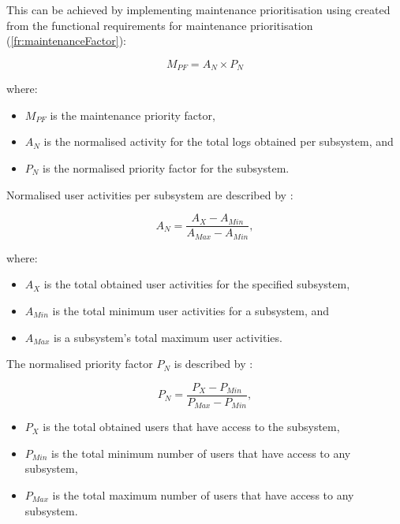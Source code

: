 This can be achieved by implementing maintenance prioritisation using  created from the functional requirements for maintenance prioritisation (\ref{fr:maintenanceFactor}):

\begin{equation}
	\label{eq:ch2_maintenanceFactorSimplified}
	M_{PF} = A_{N} \times P_{N}
\end{equation}

where:

\begin{itemize}
	\item $M_{PF}$ is the maintenance priority factor,
	\item $A_{N}$ is the normalised activity for the total logs obtained per subsystem, and
	\item $P_{N}$ is the normalised priority factor for the subsystem.
\end{itemize}

Normalised user activities per subsystem are described by :

\begin{equation}
	\label{eq:ch2_eventNormalised}
	A_{N} = \frac{A_X - A_{Min}}{A_{Max} - A_{Min}},
\end{equation}

where:

\begin{itemize}
	\item $A_X$ is the total obtained user activities for the specified subsystem,
	\item $A_{Min}$ is the total minimum user activities for a subsystem, and
	\item $A_{Max}$ is a subsystem's total maximum user activities.
\end{itemize}

The normalised priority factor $P_N$ is described by :

\begin{equation}
	\label{eq:ch2_priorityNormalised}
	P_{N} = \frac{P_X - P_{Min}}{P_{Max} - P_{Min}},
\end{equation}

\begin{itemize}
	\item $P_X$ is the total obtained users that have access to the subsystem,
	\item $P_{Min}$ is the total minimum number of users that have access to any subsystem,
	\item $P_{Max}$ is the total maximum number of users that have access to any subsystem.
\end{itemize}

